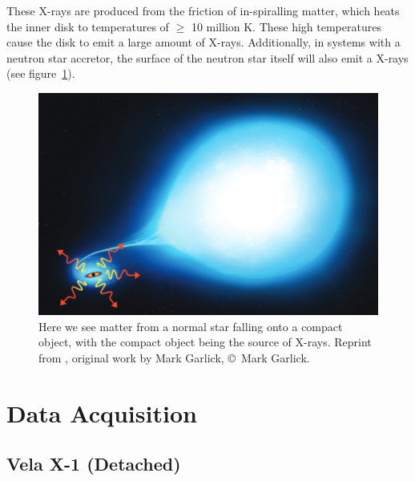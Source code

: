 \documentclass[12pt, a4paper]{article}
\begin{document}
            These X-rays are produced from the friction of in-spiralling matter, which heats the inner disk to temperatures of $\geq$ 10 million K. These high temperatures cause the disk to emit a large amount of X-rays. Additionally, in systems with a neutron star accretor, the surface of the neutron star itself will also emit a X-rays \parencite{TaurisvandenHeuvel+2023} (see figure~\ref{XrayAccretionMarkVis}). 
            \begin{figure} [H]
                \centering
                \includegraphics[width=\textwidth]{figs/reused-figs/markGarlic-Xrayaccretion.png}
                \caption{Here we see matter from a normal star falling onto a compact object, with the compact object being the source of X-rays. Reprint from \parencite{TaurisvandenHeuvel+2023}, original work by Mark Garlick, \copyright~Mark Garlick.}
                \label{XrayAccretionMarkVis}
            \end{figure}
        
\section{Data Acquisition}
    \subsection{Vela X-1 (Detached)} \label{velax1introduction}
    
\end{document}

